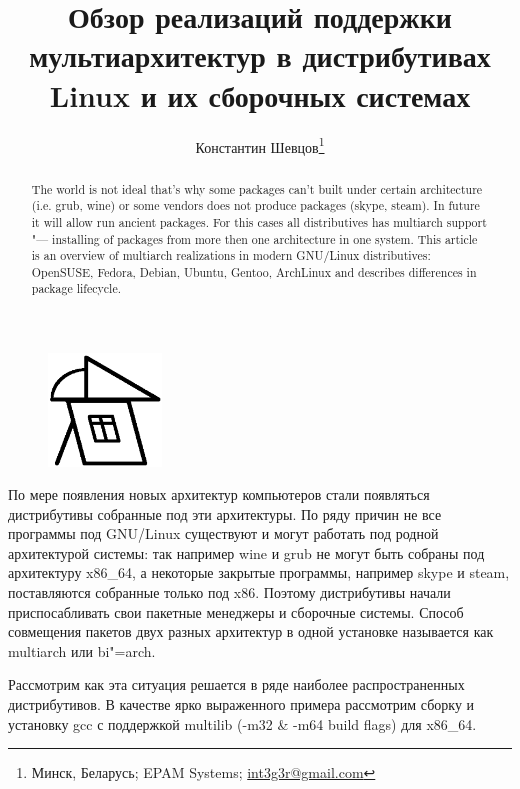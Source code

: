 \documentclass[10pt, a5paper]{article}
\begin{document}
\title{Обзор реализаций поддержки мультиархитектур в дистрибутивах Linux и их сборочных системах}%

\author{Константин Шевцов\footnote{Минск, Беларусь; EPAM Systems; \url{int3g3r@gmail.com}}}
\maketitle

\begin{abstract}
The world is not ideal that's why some packages can't built under certain architecture (i.e. grub, wine) or some vendors does not produce packages (skype, steam). In future it will allow run ancient packages.
For this cases all distributives has multiarch support "--- installing of packages from more then one architecture in one system.
This article is an overview of multiarch realizations in modern GNU/Linux distributives: OpenSUSE, Fedora, Debian, Ubuntu, Gentoo, ArchLinux and describes differences in package lifecycle.
\end{abstract}

\begin{figure}[h!]
  \centering
  \includegraphics[height=3cm]{17_multiarch_logo}
\end{figure}

По мере появления новых архитектур компьютеров стали появляться дистрибутивы собранные под эти архитектуры. По ряду причин не все программы под GNU/Linux существуют и могут работать под родной архитектурой системы: так например wine и grub не могут быть собраны под архитектуру x86\_64, а некоторые закрытые программы, например skype и steam, поставляются собранные только под x86. Поэтому дистрибутивы начали приспосабливать свои пакетные менеджеры и сборочные системы. Способ совмещения пакетов двух разных архитектур в одной установке называется как multiarch или bi"=arch.

Рассмотрим как эта ситуация решается в ряде наиболее распространенных дистрибутивов. В качестве ярко выраженного примера рассмотрим сборку и установку gcc с поддержкой multilib (-m32 \& -m64 build flags) для x86\_64.
\end{document}
